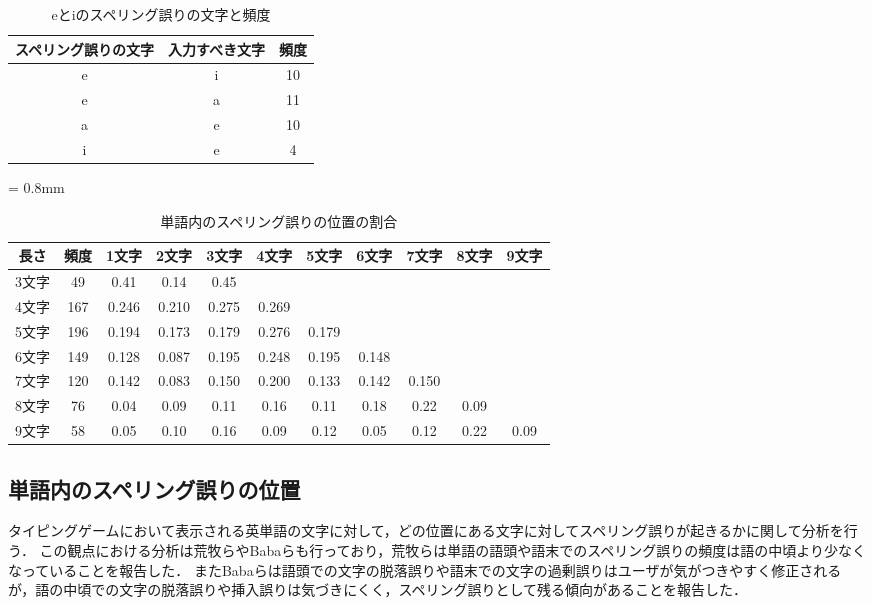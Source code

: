 \begin{comment}
表5.1においてのスペリング誤りの文字がbで入力すべき文字がvのときの頻度が9件，スペリング誤りの文字がvで入力すべき文字がbのときの頻度が12件であった．
\end{comment}

 \begin{table}[t]
  \small
  \begin{center}
   \caption{eとiのスペリング誤りの文字と頻度}
   \begin{tabular}{|c|c|c|} \hline
       	スペリング誤りの文字 & 入力すべき文字 & 頻度\\ \hline
	    e & i & 10\\ \hline
	    e & a & 11\\ \hline
	    a & e & 10\\ \hline
	    i & e & 4\\ \hline
   \end{tabular}
  \end{center}
 \end{table}

{\tabcolsep = 0.8mm
 \begin{table}[t]
  \small
  \centering
   \caption{単語内のスペリング誤りの位置の割合}
   \begin{tabular}{|c|c|c|c|c|c|c|c|c|c|c|} \hline
       	長さ & 頻度 & 1文字 & 2文字 & 3文字 & 4文字 & 5文字 & 6文字 & 7文字 & 8文字 & 9文字\\ \hline
	    3文字 & 49 & 0.41 & 0.14 & 0.45 &  &  &  &  &  & \\ \hline
	    4文字 & 167 & 0.246 & 0.210 & 0.275 & 0.269 &  &  &  &  & \\ \hline
	    5文字 & 196 & 0.194 & 0.173 & 0.179 & 0.276 & 0.179 &  &  &  & \\ \hline
	    6文字 & 149 & 0.128 & 0.087 & 0.195 & 0.248 & 0.195 & 0.148 &  &  & \\ \hline
	    7文字 & 120 & 0.142 & 0.083 & 0.150 & 0.200 & 0.133 & 0.142 & 0.150 &  & \\ \hline
	    8文字 & 76 & 0.04 & 0.09 & 0.11 & 0.16 & 0.11 & 0.18 & 0.22 & 0.09 & \\ \hline
	    9文字 & 58 & 0.05 & 0.10 & 0.16 & 0.09 & 0.12 & 0.05 & 0.12 & 0.22 & 0.09 \\ \hline
   \end{tabular}
 \end{table}
}

\subsection{単語内のスペリング誤りの位置}
タイピングゲームにおいて表示される英単語の文字に対して，どの位置にある文字に対してスペリング誤りが起きるかに関して分析を行う．
この観点における分析は荒牧ら\cite{aramakiNLP2010}やBabaら\cite{babaACL2012}も行っており，荒牧らは単語の語頭や語末でのスペリング誤りの頻度は語の中頃より少なくなっていることを報告した．
またBabaらは語頭での文字の脱落誤りや語末での文字の過剰誤りはユーザが気がつきやすく修正されるが，語の中頃での文字の脱落誤りや挿入誤りは気づきにくく，スペリング誤りとして残る傾向があることを報告した．

